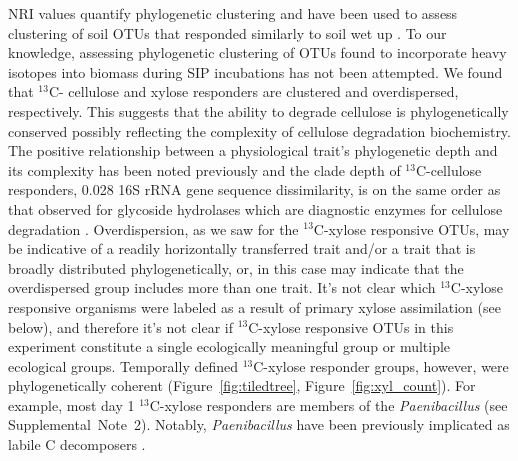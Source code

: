 NRI values quantify phylogenetic clustering \citep{Webb2000} and have 
been used to assess clustering of soil OTUs that responded similarly to soil
wet up \citep{Evans2014a,Placella2012}. To our knowledge, assessing
phylogenetic clustering of OTUs found to incorporate heavy isotopes into
biomass during SIP incubations has not been attempted. We found that $^{13}$C-
cellulose and xylose responders are clustered and overdispersed, respectively.
This suggests that the ability to degrade cellulose is phylogenetically
conserved possibly reflecting the complexity of cellulose degradation
biochemistry. The positive relationship between a physiological trait's
phylogenetic depth and its complexity has been noted previously
\citep{Martiny2013a} and the clade depth of $^{13}$C-cellulose responders,
0.028 16S rRNA gene sequence dissimilarity, is on the same order as that
observed for glycoside hydrolases which are diagnostic enzymes for cellulose
degradation \citep{Berlemont2013}. Overdispersion, as we saw for the
$^{13}$C-xylose responsive OTUs, may be indicative of a readily horizontally
transferred trait and/or a trait that is broadly distributed phylogenetically,
or, in this case may indicate that the overdispersed group includes more than
one trait. It's not clear which $^{13}$C-xylose responsive organisms were
labeled as a result of primary xylose assimilation (see below), and therefore
it's not clear if $^{13}$C-xylose responsive OTUs in this experiment constitute
a single ecologically meaningful group or multiple ecological groups.
Temporally defined $^{13}$C-xylose responder groups, however, were
phylogenetically coherent (Figure~\ref{fig:tiledtree},
Figure~\ref{fig:xyl_count}). For example, most day
1 $^{13}$C-xylose responders are members of the \textit{Paenibacillus} (see
Supplemental~Note~2). Notably, \textit{Paenibacillus} have been previously
implicated as labile C decomposers \citep{Verastegui_2014}.


